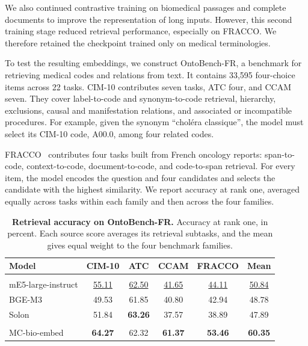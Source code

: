 We also continued contrastive training on biomedical passages and complete
documents to improve the representation of long inputs. However, this second
training stage reduced retrieval performance, especially on FRACCO. We
therefore retained the checkpoint trained only on medical terminologies.

To test the resulting embeddings, we construct OntoBench-FR, a benchmark for
retrieving medical codes and relations from text. It contains 33,595
four-choice items across 22 tasks. CIM-10 contributes seven tasks,
ATC four, and CCAM seven. They cover label-to-code and synonym-to-code
retrieval, hierarchy, exclusions, causal and manifestation relations, and
associated or incompatible procedures. For example, given the synonym
``choléra classique'', the model must select its CIM-10 code, A00.0, among four
related codes.

FRACCO~\citep{pignat2024fracco} contributes four tasks built from French
oncology reports: span-to-code, context-to-code, document-to-code, and
code-to-span retrieval. For every item, the model encodes the question and four
candidates and selects the candidate with the highest similarity. We report
accuracy at rank one, averaged equally across tasks within each family and then
across the four families.

\begin{table}[t]
  \centering
  \small
  \begin{threeparttable}[b]
    \begin{tabular}{l S[table-format=2.2] S[table-format=2.2] S[table-format=2.2] S[table-format=2.2] S[table-format=2.2]}
      \toprule
      \textbf{Model} & {\textbf{CIM-10}} & {\textbf{ATC}} & {\textbf{CCAM}} & {\textbf{FRACCO}} & {\textbf{Mean}} \\
      \midrule
       \\[1pt]
      mE5-large-instruct & \underline{55.11} & \underline{62.50} & \underline{41.65} & \underline{44.11} & \underline{50.84} \\
      BGE-M3 & 49.53 & 61.85 & 40.80 & 42.94 & 48.78 \\
      Solon & 51.84 & \bfseries 63.26 & 37.57 & 38.89 & 47.89 \\
      \midrule
       \\[1pt]
      MC-bio-embed & \bfseries 64.27 & 62.32 & \bfseries 61.37 & \bfseries 53.46 & \bfseries 60.35 \\
      \bottomrule
    \end{tabular}
  \end{threeparttable}
\caption{\textbf{Retrieval accuracy on OntoBench-FR.} Accuracy at rank one, in
percent. Each source score averages its retrieval subtasks, and the mean gives
equal weight to the four benchmark families.}
\label{tab:p3-medembed}
\end{table}

